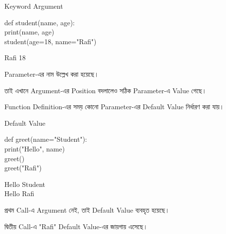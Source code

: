 \begin{codeoutputbox}{Keyword Argument}

\noindent
\begin{minipage}[t]{0.56\linewidth}
\codeheading

\begin{english}
\ttfamily
def student(name, age):\\
\hspace*{4mm}print(name, age)\\[0.5mm]
student(age=18, name="Rafi")
\end{english}

\end{minipage}
\hfill
\begin{minipage}[t]{0.40\linewidth}
\outputheading

\begin{center}
\textenglish{\ttfamily Rafi 18}
\end{center}

Parameter-এর নাম উল্লেখ করা হয়েছে।

তাই এখানে Argument-এর Position বদলালেও
সঠিক Parameter-এ Value গেছে।

\end{minipage}

\end{codeoutputbox}



Function Definition-এর সময় কোনো Parameter-এর Default Value
নির্ধারণ করা যায়।

\begin{codeoutputbox}{Default Value}

\noindent
\begin{minipage}[t]{0.54\linewidth}
\codeheading

\begin{english}
\ttfamily
def greet(name="Student"):\\
\hspace*{4mm}print("Hello", name)\\[0.5mm]
greet()\\
greet("Rafi")
\end{english}

\end{minipage}
\hfill
\begin{minipage}[t]{0.42\linewidth}
\outputheading

\begin{english}
\ttfamily
Hello Student\\
Hello Rafi
\end{english}

\medskip

প্রথম Call-এ Argument নেই,
তাই Default Value ব্যবহৃত হয়েছে।

দ্বিতীয় Call-এ
\textenglish{\ttfamily "Rafi"}
Default Value-এর জায়গায় এসেছে।

\end{minipage}

\end{codeoutputbox}

